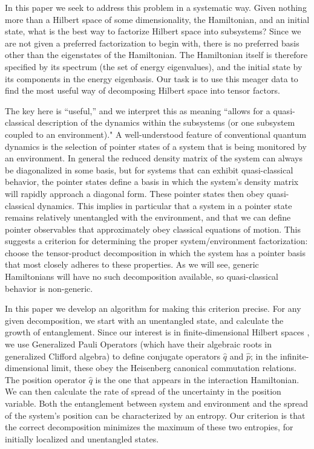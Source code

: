 \documentclass[aps,pra,onecolumn,nofootinbib,11pt,tightenlines]{revtex4-1}
\begin{document}
In this paper we seek to address this problem in a systematic way.
Given nothing more than a Hilbert space of some dimensionality, the Hamiltonian, and an initial state, what is the best way to factorize Hilbert space into subsystems?
Since we are not given a preferred factorization to begin with, there is no preferred basis other than the eigenstates of the Hamiltonian.
The Hamiltonian itself is therefore specified by its spectrum (the set of energy eigenvalues), and the initial state by its components in the energy eigenbasis.
Our task is to use this meager data to find the most useful way of decomposing Hilbert space into tensor factors. 

The key here is ``useful,'' and we interpret this as meaning ``allows for a quasi-classical description of the dynamics within the subsystems (or one subsystem coupled to an environment)."
A well-understood feature of conventional quantum dynamics is the selection of pointer states of a system that is being monitored by an environment. 
In general the reduced density matrix of the system can always be diagonalized in some basis, but for systems that can exhibit quasi-classical behavior, the pointer states define a basis in which the system's density matrix will rapidly approach a diagonal form.
These pointer states then obey quasi-classical dynamics.
This implies in particular that a system in a pointer state remains relatively unentangled with the environment, and that we can define pointer observables that approximately obey classical equations of motion. 
This suggests a criterion for determining the proper system/environment factorization: choose the tensor-product decomposition in which the system has a pointer basis that most closely adheres to these properties.
As we will see, generic Hamiltonians will have no such decomposition available, so quasi-classical behavior is non-generic.

In this paper we develop an algorithm for making this criterion precise.
For any given decomposition, we start with an unentangled state, and calculate the growth of entanglement.
Since our interest is in finite-dimensional Hilbert spaces \cite{Bao:2017rnv,Banks2000,Fischler2000}, we use Generalized Pauli Operators (which have their algebraic roots in generalized Clifford algebra) to define conjugate operators $\hat q$ and $\hat p$; in the infinite-dimensional limit, these obey the Heisenberg canonical commutation relations. 
The position operator $\hat q$ is the one that appears in the interaction Hamiltonian.
We can then calculate the rate of spread of the uncertainty in the position variable.
Both the entanglement between system and environment and the spread of the system's position can be characterized by an entropy.
Our criterion is that the correct decomposition minimizes the maximum of these two entropies, for initially localized and unentangled states.
\end{document}
